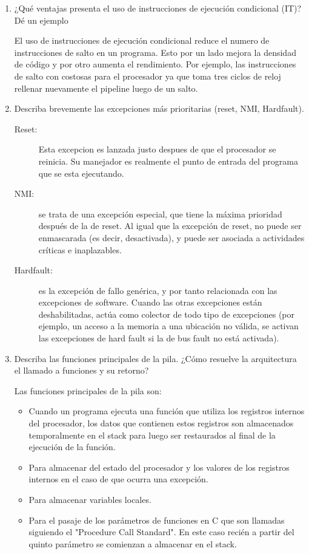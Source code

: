 \documentclass[12pt, a4paper]{article}
\makeatletter
\newcommand\setItemnumber[1]{\setcounter{enum\romannumeral\@enumdepth}{\numexpr#1-1\relax}}
\makeatother
\begin{document}
\begin{enumerate}
    
    \setItemnumber{8}
    \item ¿Qué ventajas presenta el uso de instrucciones de ejecución condicional (IT)? Dé un
    ejemplo
    
    El uso de instrucciones de ejecución condicional reduce el numero de instrucciones de salto
    en un programa. Esto por un lado mejora la densidad de código y por otro aumenta el rendimiento.
    Por ejemplo, las instrucciones de salto con costosas para el procesador ya que toma tres ciclos de 
    reloj rellenar nuevamente el pipeline luego de un salto. 

    \setItemnumber{9}
    \item Describa brevemente las excepciones más prioritarias (reset, NMI, Hardfault).
    
    \begin{description}
        \item [Reset:] Esta excepcion es lanzada justo despues de que el procesador se reinicia.
        Su manejador es realmente el punto de entrada del programa que se esta ejecutando.
        \item[NMI:] se trata de una excepción especial, que tiene la máxima prioridad después de 
        la de reset. Al igual que la excepción de reset, no puede ser enmascarada (es decir, desactivada), 
        y puede ser asociada a actividades críticas e inaplazables.
        \item[Hardfault:] es la excepción de fallo genérica, y por tanto relacionada con las excepciones de 
        software. Cuando las otras excepciones están deshabilitadas, actúa como colector de todo tipo de 
        excepciones (por ejemplo, un acceso a la memoria a una ubicación no válida, se activan las 
        excepciones de hard fault si la de bus fault no está activada).
        
    \end{description}
    
    \setItemnumber{10} 
    \item Describa las funciones principales de la pila. ¿Cómo resuelve la arquitectura el llamado 
    a funciones y su retorno?
    
    Las funciones principales de la pila son:
    
    \begin{itemize}
        \item Cuando un programa ejecuta una función que utiliza los registros internos del procesador, 
        los datos que contienen estos registros son almacenados temporalmente en el stack para luego ser
        restaurados al final de la ejecución de la función.
        \item Para almacenar del estado del procesador y los valores de los registros internos en 
        el caso de que ocurra una excepción.
        \item Para almacenar variables locales.
        \item Para el pasaje de los parámetros de funciones en C que son llamadas siguiendo 
        el "Procedure Call Standard". En este caso recién a partir del quinto parámetro se 
        comienzan a almacenar en el stack.
     \end{itemize}
    

\end{enumerate}
\end{document}

